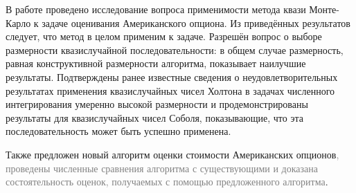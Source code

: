 \conclusion

В работе проведено исследование вопроса применимости метода квази Монте-Карло к задаче оценивания Американского опциона. Из приведённых результатов следует, что метод в целом применим к задаче. Разрешён вопрос о выборе размерности квазислучайной последовательности: в общем случае размерность, равная конструктивной размерности алгоритма, показывает наилучшие результаты. Подтверждены ранее известные сведения о неудовлетворительных результатах применения квазислучайных чисел Холтона в задачах численного интегрирования умеренно высокой размерности и продемонстрированы результаты для квазислучайных чисел Соболя, показывающие, что эта последовательность может быть успешно применена.

Также предложен новый алгоритм оценки стоимости Американских опционов\textcolor{gray}{, проведены численные сравнения алгоритма с существующими и доказана состоятельность оценок, получаемых с помощью предложенного алгоритма}.